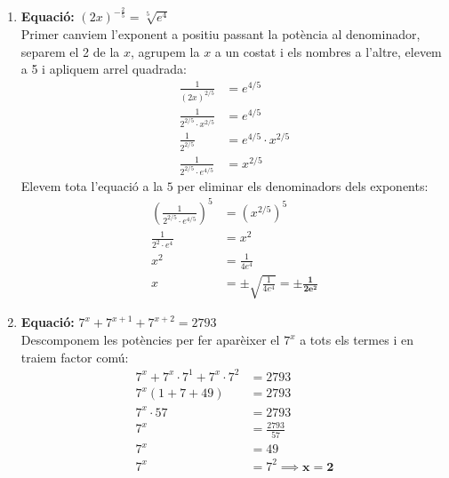 \documentclass[12pt,a4paper]{article}
\begin{document}
\begin{enumerate}[label=\textbf{\alph*)}, leftmargin=*, itemsep=1cm]
    \item \textbf{Equació:} $(2x)^{-\frac{2}{5}} = \sqrt[5]{e^4}$ \\
    Primer canviem l'exponent a positiu passant la potència al denominador, separem el 2 de la $x$, agrupem la $x$ a un costat i els nombres a l'altre, elevem a 5 i apliquem arrel quadrada:
    \begin{align*}
        \frac{1}{(2x)^{2/5}} &= e^{4/5} \\
        \frac{1}{2^{2/5} \cdot x^{2/5}} &= e^{4/5} \\
        \frac{1}{2^{2/5}} &= e^{4/5} \cdot x^{2/5} \\
        \frac{1}{2^{2/5} \cdot e^{4/5}} &= x^{2/5}
    \end{align*}
    Elevem tota l'equació a la $5$ per eliminar els denominadors dels exponents:
    \begin{align*}
        \left( \frac{1}{2^{2/5} \cdot e^{4/5}} \right)^5 &= \left( x^{2/5} \right)^5 \\
        \frac{1}{2^2 \cdot e^4} &= x^2 \\
        x^2 &= \frac{1}{4e^4} \\
        x &= \pm \sqrt{\frac{1}{4e^4}} = \mathbf{\pm \frac{1}{2e^2}}
    \end{align*}

    \item \textbf{Equació:} $7^x + 7^{x+1} + 7^{x+2} = 2793$ \\
    Descomponem les potències per fer aparèixer el $7^x$ a tots els termes i en traiem factor comú:
    \begin{align*}
        7^x + 7^x \cdot 7^1 + 7^x \cdot 7^2 &= 2793 \\
        7^x (1 + 7 + 49) &= 2793 \\
        7^x \cdot 57 &= 2793 \\
        7^x &= \frac{2793}{57} \\
        7^x &= 49 \\
        7^x &= 7^2 \implies \mathbf{x = 2}
    \end{align*}

\end{enumerate}
\end{document}

